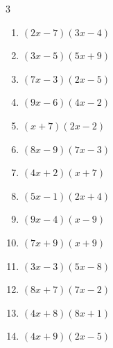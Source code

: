 \begin{multicols}{3}
\begin{enumerate}

  \item $(2x-7)(3x-4)$


  \item $(3x-5)(5x+9)$


  \item $(7x-3)(2x-5)$


  \item $(9x-6)(4x-2)$


  \item $(x+7)(2x-2)$


  \item $(8x-9)(7x-3)$


  \item $(4x+2)(x+7)$


  \item $(5x-1)(2x+4)$


  \item $(9x-4)(x-9)$


  \item $(7x+9)(x+9)$


  \item $(3x-3)(5x-8)$


  \item $(8x+7)(7x-2)$


\columnbreak %

\resetques

  \item $(4x+8)(8x+1)$


  \item $(4x+9)(2x-5)$


\end{enumerate}
\end{multicols}
